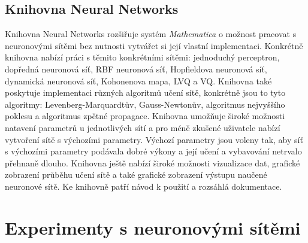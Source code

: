 \documentclass[11pt,twoside,a4paper]{book}
\begin{document}
\section{Knihovna Neural Networks}
Knihovna Neural Networks rozšiřuje systém \textit{Mathematica} o možnost pracovat s neuronovými sítěmi bez nutnosti vytvářet si její vlastní implementaci. Konkrétně knihovna nabízí práci s těmito konkrétními sítěmi: jednoduchý perceptron, dopředná neuronová síť, RBF neuronová síť, Hopfieldova neuronová síť, dynamická neuronová síť, Kohonenova mapa, LVQ a VQ. Knihovna také poskytuje implementaci různých algoritmů učení sítě, konkrétně jsou to tyto algoritmy: Levenberg-Marquardtův, Gauss-Newtonův, algoritmus nejvyššího poklesu a algoritmus zpětné propagace. Knihovna umožňuje široké možnosti natavení parametrů u jednotlivých sítí a pro méně zkušené uživatele nabízí vytvoření sítě s výchozími parametry. Výchozí parametry jsou voleny tak, aby síť s výchozími parametry podávala dobré výkony a její učení a vybavování netrvalo přehnaně dlouho. Knihovna ještě nabízí široké možnosti vizualizace dat, grafické zobrazení průběhu učení sítě a také grafické zobrazení výstupu naučené neuronové sítě. Ke knihovně patří návod k použití a rozsáhlá dokumentace.
\chapter{Experimenty s neuronovými sítěmi}
\end{document}
